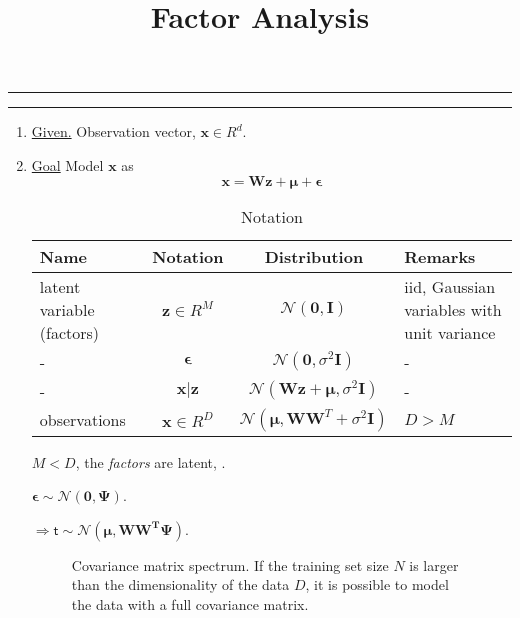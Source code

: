 
\title{Factor Analysis}
\date{}

\maketitle
\rule[0pt]{\textwidth}{1pt}
\tableofcontents
\rule[0pt]{\textwidth}{1pt}

\begin{enumerate}
\item \underline{Given.}  Observation vector, $\mathbf{x}  \in R^d$.
\item \underline{Goal}
Model $\mathbf{x}$ as
\begin{equation}
\mathbf{x} = \mathbf{W}\mathbf{z}+ \mathbf{\mu} + \mathbf{\epsilon}
\end{equation}

\begin{table}[h]
\centering
\begin{tabular}{| l | c | c | l |}\hline
\textbf{Name} & \textbf{Notation} & \textbf{Distribution} & \textbf{Remarks}\\\hline
latent variable (factors) & $\mathbf{z} \in R^M$ & $ \mathcal{N}(\mathbf{0},\mathbf{I})$ & \parbox{2in}{iid, Gaussian variables with unit variance}\\\hline
- & $ \mathbf{\epsilon}$ & $ \mathcal{N}(\mathbf{0},\sigma^2\mathbf{I})$ &-\\\hline
- & $\mathbf{x|z} $ & $ \mathcal{N}(\mathbf{Wz+\mu},\sigma^2\mathbf{I})$ &-\\\hline							
observations & $\mathbf{x} \in R^D$ & $ \mathcal{N}(\mathbf{\mu},\mathbf{WW}^T + \sigma^2\mathbf{I})$ &$D>M$ \\\hline
\end{tabular}
\caption{Notation}
\end{table}

 $M<D$, the \emph{factors} are latent, .

$\mathbf{\epsilon}\sim \mathcal{N}(\mathbf{0},\mathbf{\Psi})$.

$\Rightarrow \mathsf{t}\sim \mathcal{N}(\mathbf{\mu},\mathbf{WW^T\Psi})$.


								\begin{figure}
								\centering
								\caption{Covariance matrix spectrum.  If the training set size $N$ is larger than the dimensionality of the data $D$, it is possible to model the data with a full covariance matrix.} 
								\label{fig:covariance_matrix_spectrum}
								\end{figure}


\end{enumerate}
